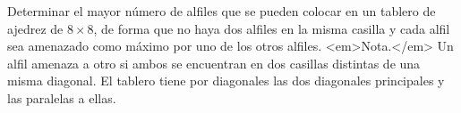Determinar el mayor número de alfiles que se pueden colocar en un tablero de ajedrez de $8 \times 8$, de forma que no haya dos alfiles en la misma casilla y cada alfil sea amenazado como máximo por uno de los otros alfiles. \newline 
<em>Nota.</em> Un alfil amenaza a otro si ambos se encuentran en dos casillas distintas de una misma diagonal. El tablero tiene por diagonales las dos diagonales principales y las paralelas a ellas.
